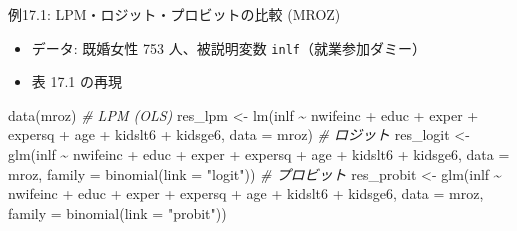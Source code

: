 \documentclass[
  ignorenonframetext,
]{beamer}
\newenvironment{Shaded}{\begin{snugshade}}{\end{snugshade}}
\newcommand{\AttributeTok}[1]{\textcolor[rgb]{0.77,0.63,0.00}{#1}}
\newcommand{\CommentTok}[1]{\textcolor[rgb]{0.56,0.35,0.01}{\textit{#1}}}
\newcommand{\FunctionTok}[1]{\textcolor[rgb]{0.00,0.00,0.00}{#1}}
\newcommand{\NormalTok}[1]{#1}
\newcommand{\OtherTok}[1]{\textcolor[rgb]{0.56,0.35,0.01}{#1}}
\newcommand{\SpecialCharTok}[1]{\textcolor[rgb]{0.00,0.00,0.00}{#1}}
\newcommand{\StringTok}[1]{\textcolor[rgb]{0.31,0.60,0.02}{#1}}
\providecommand{\tightlist}{%
  \setlength{\itemsep}{0pt}\setlength{\parskip}{0pt}}
\begin{document}
\begin{frame}[fragile]{例17.1: LPM・ロジット・プロビットの比較 (MROZ)}
\protect\hypertarget{ux4f8b17.1-lpmux30edux30b8ux30c3ux30c8ux30d7ux30edux30d3ux30c3ux30c8ux306eux6bd4ux8f03-mroz}{}
\begin{itemize}
\tightlist
\item
  データ: 既婚女性 753 人、被説明変数 \texttt{inlf}（就業参加ダミー）
\item
  表 17.1 の再現
\end{itemize}

\footnotesize

\begin{Shaded}
\begin{Highlighting}[]
\FunctionTok{data}\NormalTok{(mroz)}
\CommentTok{\# LPM (OLS)}
\NormalTok{res\_lpm }\OtherTok{\textless{}{-}} \FunctionTok{lm}\NormalTok{(inlf }\SpecialCharTok{\textasciitilde{}}\NormalTok{ nwifeinc }\SpecialCharTok{+}\NormalTok{ educ }\SpecialCharTok{+}\NormalTok{ exper }\SpecialCharTok{+}\NormalTok{ expersq }\SpecialCharTok{+}
\NormalTok{                age }\SpecialCharTok{+}\NormalTok{ kidslt6 }\SpecialCharTok{+}\NormalTok{ kidsge6, }\AttributeTok{data =}\NormalTok{ mroz)}
\CommentTok{\# ロジット}
\NormalTok{res\_logit }\OtherTok{\textless{}{-}} \FunctionTok{glm}\NormalTok{(inlf }\SpecialCharTok{\textasciitilde{}}\NormalTok{ nwifeinc }\SpecialCharTok{+}\NormalTok{ educ }\SpecialCharTok{+}\NormalTok{ exper }\SpecialCharTok{+}\NormalTok{ expersq }\SpecialCharTok{+}
\NormalTok{                   age }\SpecialCharTok{+}\NormalTok{ kidslt6 }\SpecialCharTok{+}\NormalTok{ kidsge6,}
                 \AttributeTok{data =}\NormalTok{ mroz, }\AttributeTok{family =} \FunctionTok{binomial}\NormalTok{(}\AttributeTok{link =} \StringTok{"logit"}\NormalTok{))}
\CommentTok{\# プロビット}
\NormalTok{res\_probit }\OtherTok{\textless{}{-}} \FunctionTok{glm}\NormalTok{(inlf }\SpecialCharTok{\textasciitilde{}}\NormalTok{ nwifeinc }\SpecialCharTok{+}\NormalTok{ educ }\SpecialCharTok{+}\NormalTok{ exper }\SpecialCharTok{+}\NormalTok{ expersq }\SpecialCharTok{+}
\NormalTok{                    age }\SpecialCharTok{+}\NormalTok{ kidslt6 }\SpecialCharTok{+}\NormalTok{ kidsge6,}
                  \AttributeTok{data =}\NormalTok{ mroz, }\AttributeTok{family =} \FunctionTok{binomial}\NormalTok{(}\AttributeTok{link =} \StringTok{"probit"}\NormalTok{))}
\end{Highlighting}
\end{Shaded}

\normalsize
\end{frame}
\end{document}

